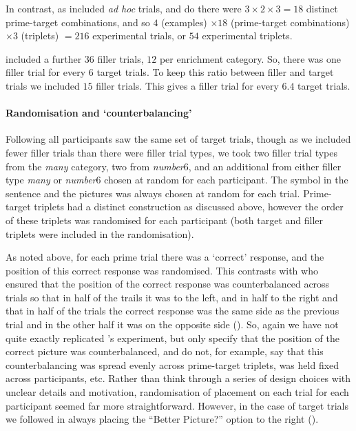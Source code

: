 \documentclass[10pt]{article}
\begin{document}
\begin{multicols}{2}
In contrast, as \citeauthor{Bott:2016aa} included \emph{ad hoc} trials, and do there were \(3 \times 2 \times 3 = 18\) distinct prime-target combinations, and so  \(4\) (examples) \(\times 18\) (prime-target combinations) \(\times 3\) (triplets) \(= 216\) experimental trials, or \(54\) experimental triplets.

\citeauthor{Bott:2016aa} included a further \(36\) filler trials, \(12\) per enrichment category.
So, there was one filler trial for every \(6\) target trials.
To keep this ratio between filler and target trials we included \(15\) filler trials.
This gives a filler trial for every \(6.4\) target trials.

\paragraph{Randomisation and `counterbalancing'}

Following \citeauthor{Bott:2016aa} all participants saw the same set of target trials, though as we included fewer filler trials than there were filler trial types, we took two filler trial types from the \emph{many} category, two from \emph{number\(6\)}, and an additional from either filler type \emph{many} or \emph{number\(6\)} chosen at random for each participant.
The symbol in the sentence and the pictures was always chosen at random for each trial.
Prime-target triplets had a distinct construction as discussed above, however the order of these triplets was randomised for each participant (both target and filler triplets were included in the randomisation).

As noted above, for each prime trial there was a `correct' response, and the position of this correct response was randomised.
This contrasts with \citeauthor{Bott:2016aa} who ensured that the position of the correct response was counterbalanced across trials so that in half of the trails it was to the left, and in half to the right and that in half of the trials the correct response was the same side as the previous trial and in the other half it was on the opposite side (\citeyear[124]{Bott:2016aa}).
So, again we have not quite exactly replicated \citeauthor{Bott:2016aa}'s experiment, but \citeauthor{Bott:2016aa} only specify that the position of the correct picture was counterbalanced, and do not, for example, say that this counterbalancing was spread evenly across prime-target triplets, was held fixed across participants, etc.
Rather than think through a series of design choices with unclear details and motivation, randomisation of placement on each trial for each participant seemed far more straightforward.
However, in the case of target trials we followed \citeauthor{Bott:2016aa} in always placing the ``Better Picture?'' option to the right (\citeyear[124]{Bott:2016aa}).


\end{multicols}
\end{document}
